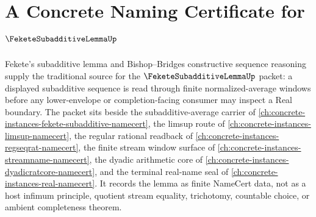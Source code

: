 \chapter{A Concrete Naming Certificate for $\FeketeSubadditiveLemmaUp$}
\label{ch:concrete-instances-fekete-subadditive-lemma-namecert}

Fekete's subadditive lemma and Bishop--Bridges constructive sequence reasoning supply the traditional source for the $\FeketeSubadditiveLemmaUp$ packet: a displayed subadditive sequence is read through finite normalized-average windows before any lower-envelope or completion-facing consumer may inspect a Real boundary. The packet sits beside the subadditive-average carrier of \autoref{ch:concrete-instances-fekete-subadditive-namecert}, the limsup route of \autoref{ch:concrete-instances-limsup-namecert}, the regular rational readback of \autoref{ch:concrete-instances-regseqrat-namecert}, the finite stream window surface of \autoref{ch:concrete-instances-streamname-namecert}, the dyadic arithmetic core of \autoref{ch:concrete-instances-dyadicratcore-namecert}, and the terminal real-name seal of \autoref{ch:concrete-instances-real-namecert}. It records the lemma as finite NameCert data, not as a host infimum principle, quotient stream equality, trichotomy, countable choice, or ambient completeness theorem.

